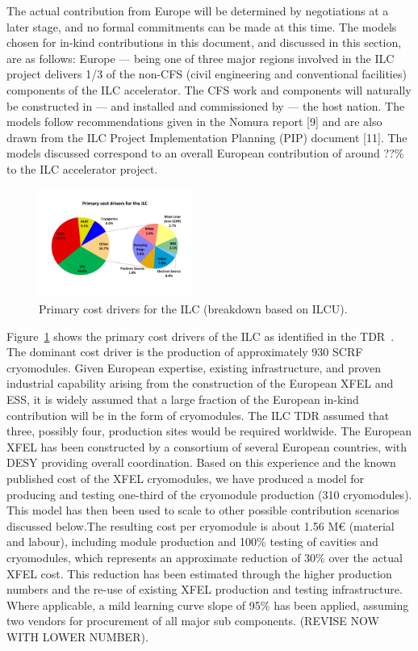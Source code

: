 \documentclass[%
 reprint,
 amsmath,amssymb,
 aps,
]{revtex4-1}
\begin{document}
The actual contribution from Europe will be determined by negotiations at a later stage, and no formal commitments can be made at this time. The models chosen for in-kind contributions in this document, and discussed in this section, are as follows: Europe — being one of three major regions involved in the ILC project delivers 1/3 of  the  non-CFS  (civil  engineering  and  conventional  facilities) components  of  the  ILC  accelerator.   The  CFS  work  and  components  will  naturally  be constructed in — and installed and commissioned by — the host nation.   The models follow recommendations given in the Nomura report [9] and are also drawn from the ILC Project Implementation Planning (PIP) document [11]. The models discussed correspond to an overall European contribution of around ??\% to the ILC accelerator project. 

\begin{figure}[htbp]
\begin{center}
\includegraphics[width=0.45\textwidth]{figures/eap-chp3-ilccostdrivers.pdf}
 \caption{\label{fig:constructionmodel:ILCPrimaryCostDrivers} Primary cost drivers for the ILC (breakdown based on ILCU).}
\end{center}
\end{figure}

Figure~\ref{fig:constructionmodel:ILCPrimaryCostDrivers} shows the primary cost drivers 
of the ILC as identified in the TDR~\cite{ILC-TDR}. The dominant cost driver is the 
production of approximately 930 SCRF cryomodules. Given European expertise, 
existing infrastructure, and proven industrial capability arising from the construction 
of the European XFEL and ESS, it is widely assumed that a large fraction of the European in-kind contribution  
will be in the form of cryomodules. The ILC TDR assumed that three, possibly four, production sites 
would be required worldwide.  
The European XFEL has been constructed by a consortium of several European countries, with DESY providing overall coordination.  Based on this experience and the known published cost  of the XFEL cryomodules, we have produced a model for producing and testing one-third of the cryomodule production (310 cryomodules). This model has then been used to scale to other possible contribution scenarios discussed below.The resulting cost per cryomodule is about 1.56 M\euro{} (material and labour), including module production and 100\% testing of cavities and cryomodules, which represents an approximate reduction of 30\% over the actual XFEL cost.  This reduction has been estimated through the higher production numbers and the re-use of existing XFEL production and testing infrastructure.  Where applicable, a mild learning curve slope of 95\% has been applied, assuming two vendors for procurement of all major sub components. (REVISE NOW WITH LOWER NUMBER).
\end{document}
